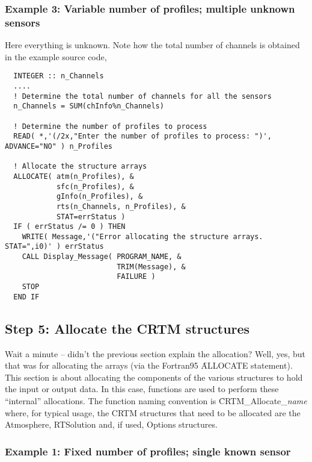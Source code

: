 \subsubsection{Example 3: Variable number of profiles; multiple unknown sensors}
Here everything is unknown. Note how the total number of channels is obtained in the example source code,
\begin{ttfamily}
  \begin{verbatim}
  INTEGER :: n_Channels
  ....
  ! Determine the total number of channels for all the sensors
  n_Channels = SUM(chInfo%n_Channels)
  
  ! Determine the number of profiles to process
  READ( *,'(/2x,"Enter the number of profiles to process: ")', ADVANCE="NO" ) n_Profiles
  
  ! Allocate the structure arrays
  ALLOCATE( atm(n_Profiles), &
            sfc(n_Profiles), &
            gInfo(n_Profiles), &
            rts(n_Channels, n_Profiles), &
            STAT=errStatus )
  IF ( errStatus /= 0 ) THEN 
    WRITE( Message,'("Error allocating the structure arrays. STAT=",i0)' ) errStatus
    CALL Display_Message( PROGRAM_NAME, &
                          TRIM(Message), & 
                          FAILURE )
    STOP
  END IF\end{verbatim}
\end{ttfamily}


\subsection{Step 5: Allocate the CRTM structures}
Wait a minute -- didn't the previous section explain the allocation? Well, yes, but that was for allocating the arrays (via the Fortran95 \f{ALLOCATE} statement). This section is about allocating the components of the various structures to hold the input or output data. In this case, functions are used to perform these ``internal'' allocations. The function naming convention is \f{CRTM\_Allocate\_}\textit{name} where, for typical usage, the CRTM structures that need to be allocated are the Atmosphere, RTSolution and, if used, Options structures.

\subsubsection{Example 1: Fixed number of profiles; single known sensor}

